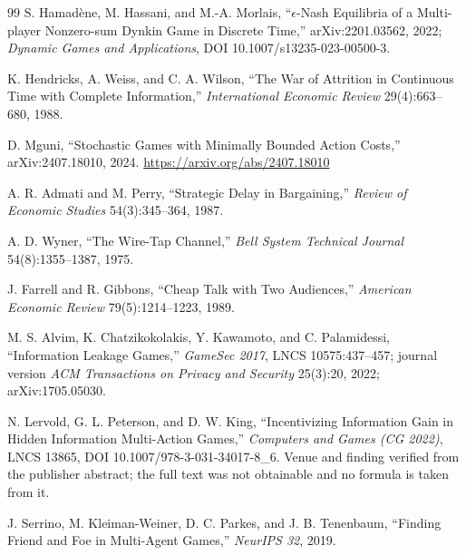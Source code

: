 \documentclass[11pt]{article}
\theoremstyle{definition}
\begin{document}
\begin{thebibliography}{99}
S. Hamad\`ene, M. Hassani, and M.-A. Morlais, ``$\epsilon$-Nash Equilibria of a
Multi-player Nonzero-sum Dynkin Game in Discrete Time,'' arXiv:2201.03562, 2022;
\emph{Dynamic Games and Applications}, DOI 10.1007/s13235-023-00500-3.

K. Hendricks, A. Weiss, and C. A. Wilson, ``The War of Attrition in Continuous
Time with Complete Information,'' \emph{International Economic Review}
29(4):663--680, 1988.

D. Mguni, ``Stochastic Games with Minimally Bounded Action Costs,''
arXiv:2407.18010, 2024. \url{https://arxiv.org/abs/2407.18010}

A. R. Admati and M. Perry, ``Strategic Delay in Bargaining,'' \emph{Review of
Economic Studies} 54(3):345--364, 1987.


A. D. Wyner, ``The Wire-Tap Channel,'' \emph{Bell System Technical Journal}
54(8):1355--1387, 1975.

J. Farrell and R. Gibbons, ``Cheap Talk with Two Audiences,'' \emph{American
Economic Review} 79(5):1214--1223, 1989.

M. S. Alvim, K. Chatzikokolakis, Y. Kawamoto, and C. Palamidessi, ``Information
Leakage Games,'' \emph{GameSec 2017}, LNCS 10575:437--457; journal version
\emph{ACM Transactions on Privacy and Security} 25(3):20, 2022;
arXiv:1705.05030.

N. Lervold, G. L. Peterson, and D. W. King, ``Incentivizing Information Gain in
Hidden Information Multi-Action Games,'' \emph{Computers and Games (CG 2022)},
LNCS 13865, DOI 10.1007/978-3-031-34017-8\_6. Venue and finding verified from the
publisher abstract; the full text was not obtainable and no formula is taken from
it.

J. Serrino, M. Kleiman-Weiner, D. C. Parkes, and J. B. Tenenbaum, ``Finding
Friend and Foe in Multi-Agent Games,'' \emph{NeurIPS 32}, 2019.



\end{thebibliography}
\end{document}
